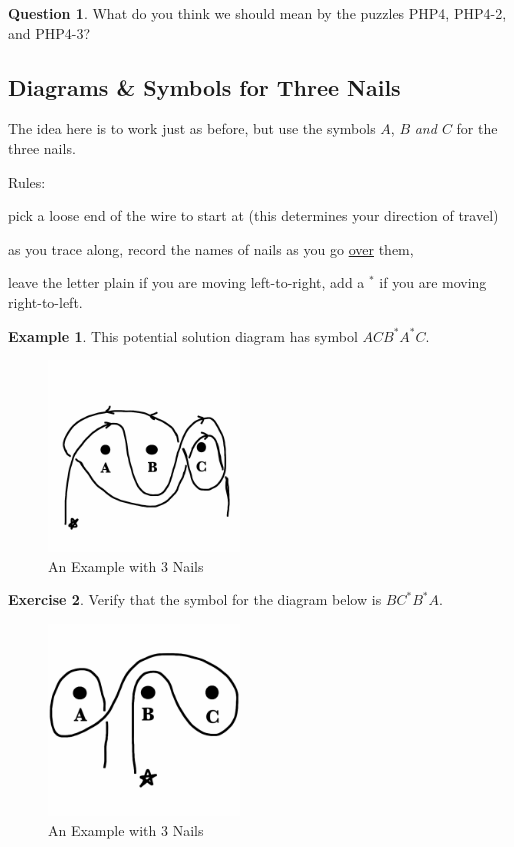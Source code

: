 \documentclass[12pt,letterpaper]{article}
\theoremstyle{definition}
\newtheorem{question}{Question}
\newtheorem{example}{Example}
\newtheorem{exercise}[question]{Exercise}
\begin{document}
\begin{question}
What do you think we should mean by the puzzles PHP4, PHP4-2, and PHP4-3?
\end{question}


\subsection*{Diagrams \& Symbols for Three Nails}

The idea here is to work just as before, but use the symbols $A$, $B$ \emph{and $C$} for the three nails.

Rules:
\begin{compactitem}
\item pick a loose end of the wire to start at (this determines your direction of travel)
\item as you trace along, record the names of nails as you go \underline{over} them,
\item leave the letter plain if you are moving left-to-right, add a ${}^*$ if you are moving right-to-left.
\end{compactitem}

\begin{example}
This potential solution diagram has symbol $ACB^*A^*C$.
\begin{figure}[h]
\centering
\includegraphics[height=2in]{phppics/ACBsAsC.png}
\caption{An Example with 3 Nails}
\end{figure}
\end{example}

\begin{exercise}\label{exercise:mainex}
Verify that the symbol for the diagram below is $BC^*B^*A$.
\begin{figure}[h]
\centering
\includegraphics[height=2in]{phppics/BCsBsA.png}
\caption{An Example with 3 Nails}
\end{figure}
\end{exercise}
\end{document}
